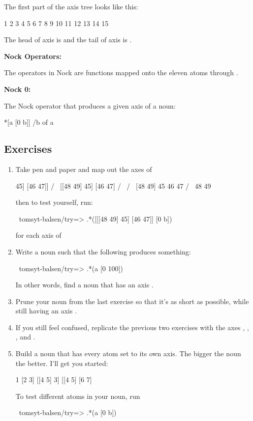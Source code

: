 The first part of the axis tree looks like this:
\begin{code}
         1
    2          3
 4    5     6     7
8 9 10 11 12 13 14 15
\end{code}
The head of axis  is  and the tail of axis  is .

\textbf{Nock Operators:}

The operators in Nock are functions mapped onto the eleven atoms  through .

\textbf{Nock 0:}

The Nock operator that produces a given axis of a noun:
\begin{code}
*[a [0 b]]               /b of a
\end{code}

\subsection{Exercises}

\begin{enumerate}
\item Take pen and paper and map out the axes of
\begin{code}
   [[[48 49] 45] [46 47]]
       /             \
 [[48 49] 45]      [46 47]
   /       \        /   \
[48 49]    45      46   47
 /   \
48   49
\end{code}
then to test yourself, run:
\begin{code}
~tomsyt-balsen/try=> .*([[[48 49] 45] [46 47]] [0 b])
\end{code}
for each axis  of \kode{[[[48 49] 45] [46 47]]}
\item Write a noun \kode{a} such that the following produces something:
\begin{code}
~tomsyt-balsen/try=> .*(a [0 100])
\end{code}
In other words, find a noun that has an axis .
\item Prune your noun from the last exercise so that it's as short as possible,
while still having an axis .
\item If you still feel confused, replicate the previous two exercises with the
axes \kode{/7}, \kode{/17}, \kode{/27}, \kode{/47} and \kode{/87}.
\item Build a noun that has every atom set to its own axis. The bigger the noun
the better. I'll get you started:
\begin{code}
1
[2 3]
[[4 5] 3]
[[4 5] [6 7]
\end{code}
To test different atoms in your noun, run
\begin{code}
~tomsyt-balsen/try=> .*(a [0 b])
\end{code}
\end{enumerate}

